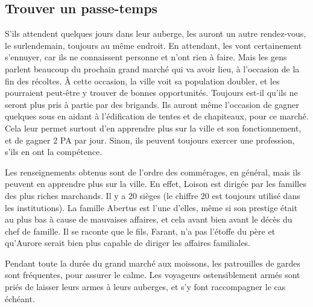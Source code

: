 \documentclass[a4paper,10pt,openany]{book}
\begin{document}
\begin{multicols}{2}
\subsection{Trouver un passe-temps}
S’ils attendent quelques jours dans leur auberge, les \PJs auront un autre rendez-vous, le surlendemain, toujours au même endroit. En attendant, les
\PJs vont certainement s’ennuyer, car ils ne connaissent personne et n’ont rien à faire. Mais les gens parlent beaucoup du prochain grand marché qui
va avoir lieu, à l’occasion de la fin des récoltes. À cette occasion, la ville voit sa population doubler, et les \PJs pourraient peut-être y trouver
de bonnes opportunités. Toujours est-il qu’ils ne seront plus pris à partie par des brigands. Ils auront même l’occasion de gagner quelques sous en
aidant à l’édification de tentes et de chapiteaux, pour ce marché. Cela leur permet surtout d’en apprendre plus sur la ville et son fonctionnement, et
de gagner 2 PA par jour. Sinon, ils peuvent toujours exercer une profession, s’ils en ont la compétence.\par Les renseignements obtenus sont de
l’ordre des commérages, en général, mais ils peuvent en apprendre plus sur la ville. En effet, Loison est dirigée par les familles des plus riches
marchands. Il y a 20 sièges (le chiffre 20 est toujours utilisé dans les institutions). La famille Abertus est l’une d’elles, même si son prestige
était au plus bas à cause de mauvaises affaires, et cela avant bien avant le décès du chef de famille. Il se raconte que le fils, Farant, n’a pas
l’étoffe du père et qu’Aurore serait bien plus capable de diriger les affaires familiales.\par Pendant toute la durée du grand marché aux moissons,
les patrouilles de gardes sont fréquentes, pour assurer le calme. Les voyageurs ostensiblement armés sont priés de laisser leurs armes à leurs
auberges, et s’y font raccompagner le cas échéant.

\end{multicols}
\end{document}
